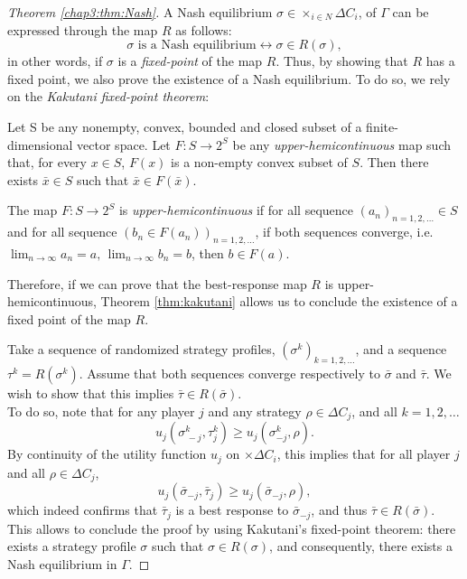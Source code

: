 \begin{proof}[Theorem \ref{chap3:thm:Nash}]
A Nash equilibrium $\sigma \in \times_{i \in N} \Delta C_i$, of $\Gamma$ can be expressed through the map $R$ as follows:
$$\sigma \text{ is a Nash equilibrium} \leftrightarrow \sigma \in R(\sigma), $$
in other words, if $\sigma$ is a \emph{fixed-point} of the map $R$.
Thus,  by showing that $R$ has a fixed point, we also prove the existence of a Nash equilibrium.
To do so, we rely on the \emph{Kakutani fixed-point theorem}:

\begin{theorem}[Kakutani]
Let S be any nonempty, convex, bounded and closed subset of a finite-dimensional vector space. Let
$F: S \rightarrow 2^S$ be any \emph{upper-hemicontinuous} map such that, for every $x \in S$, $F(x)$ is a non-empty convex subset of $S$. Then there exists $\bar{x} \in S$ such that $\bar{x} \in F(\bar{x})$.
\label{thm:kakutani}
\end{theorem}

\begin{definition}
The map $F : S \rightarrow 2^S$ is \emph{upper-hemicontinuous} if
for all sequence $(a_n)_{n = 1,2, \ldots} \in S$ and for all sequence $(b_n \in F(a_n))_{n = 1,2, \ldots}$,
if both sequences converge, i.e.
$\lim_{n \rightarrow \infty} a_n = a, \, \lim_{n \rightarrow \infty} b_n = b $, then $ b \in F(a). $
\end{definition}


Therefore, if we can prove that the best-response map $R$ is upper-hemicontinuous, Theorem \ref{thm:kakutani} allows us to conclude the existence of a fixed point of the map $R$.

Take a sequence of randomized strategy profiles, $(\sigma^k)_{k = 1,2, \ldots}$, and a sequence $\tau^k = R(\sigma^k)$. Assume that both sequences converge respectively to $\bar{\sigma}$ and $\bar{\tau}$. We wish to show that this implies $\bar{\tau} \in R(\bar{\sigma})$.\\
To do so, note that for any player $j$ and any strategy $\rho \in \Delta C_j$, and all $k = 1,2, \ldots$
$$u_j(\sigma_{\, -j}^k, \tau^k_j) \geq u_j(\sigma_{ -j }^k, \rho). $$
By continuity of the utility function $u_j$ on $\times \Delta C_i$, this implies that for all player $j$ and all $\rho \in \Delta C_j$,
$$ u_j(\bar{\sigma}_{ -j}, \bar{\tau}_j ) \geq u_j(\bar{\sigma}_{-j }, \rho),$$
which indeed confirms that $\bar{\tau}_j$ is a best response to $\bar{\sigma}_{ -j}$, and thus $\bar{\tau} \in R(\bar{\sigma})$. This allows to conclude the proof by using Kakutani's fixed-point theorem: there exists a strategy profile $\sigma$ such that $\sigma \in R(\sigma)$, and consequently, there exists a Nash equilibrium in $\Gamma$.
\end{proof}


